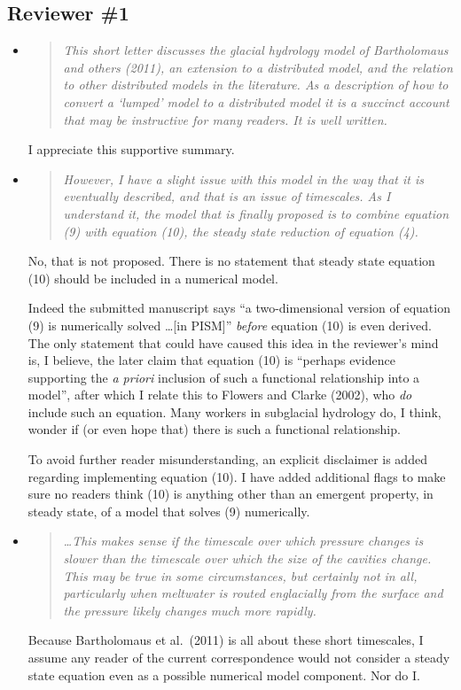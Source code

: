 \documentclass[11pt,reqno]{amsart}
\newcommand{\reply}[2]{
\medskip\medskip
\item  \begin{quote}
\emph{#1}
\end{quote}

\medskip
\noindent #2}
\begin{document}
\subsection*{Reviewer \#1}  \begin{itemize}
\reply{This short letter discusses the glacial hydrology model of Bartholomaus and others (2011), an extension to a distributed model, and the relation to other distributed models in the literature.  As a description of how to convert a `lumped' model to a distributed model it is a succinct account that may be instructive for many readers.  It is well written.}
{I appreciate this supportive summary.}

\reply{However, I have a slight issue with this model in the way that it is eventually described, and that is an issue of timescales.  As I understand it, the model that is finally proposed is to combine equation (9) with equation (10), the steady state reduction of equation (4).}
{No, that is not proposed.  There is no statement that steady state equation (10) should be included in a numerical model.

Indeed the submitted manuscript says ``a two-dimensional version of equation (9) is numerically solved \dots [in PISM]'' \emph{before} equation (10) is even derived.  The only statement that could have caused this idea in the reviewer's mind is, I believe, the later claim that equation (10) is ``perhaps evidence supporting the \emph{a priori} inclusion of such a functional relationship into a model'', after which I relate this to Flowers and Clarke (2002), who \emph{do} include such an equation.  Many workers in subglacial hydrology do, I think, wonder if (or even hope that) there is such a functional relationship.

To avoid further reader misunderstanding, an explicit disclaimer is added regarding implementing equation (10).  I have added additional flags to make sure no readers think (10) is anything other than an emergent property, in steady state, of a model that solves (9) numerically.}

\reply{\dots This makes sense if the timescale over which pressure changes is slower than the timescale over which the size of the cavities change. This may be true in some circumstances, but certainly not in all, particularly when meltwater is routed englacially from the surface and the pressure likely changes much more rapidly.}
{Because Bartholomaus et al.~(2011) is all about these short timescales, I assume any reader of the current correspondence would not consider a steady state equation even as a possible numerical model component.  Nor do I.

}
\end{itemize}
\end{document}
